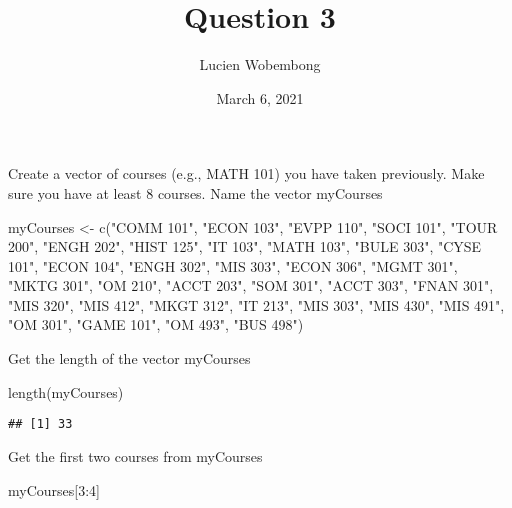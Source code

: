 \documentclass[]{article}
\title{Question 3}
\author{Lucien Wobembong}
\date{March 6, 2021}
\newenvironment{Shaded}{\begin{snugshade}}{\end{snugshade}}
\newcommand{\DecValTok}[1]{\textcolor[rgb]{0.00,0.00,0.81}{#1}}
\newcommand{\FunctionTok}[1]{\textcolor[rgb]{0.00,0.00,0.00}{#1}}
\newcommand{\NormalTok}[1]{#1}
\newcommand{\OtherTok}[1]{\textcolor[rgb]{0.56,0.35,0.01}{#1}}
\newcommand{\SpecialCharTok}[1]{\textcolor[rgb]{0.00,0.00,0.00}{#1}}
\newcommand{\StringTok}[1]{\textcolor[rgb]{0.31,0.60,0.02}{#1}}
\begin{document}
\maketitle

Create a vector of courses (e.g., MATH 101) you have taken previously.
Make sure you have at least 8 courses. Name the vector myCourses

\begin{Shaded}
\begin{Highlighting}[]
\NormalTok{myCourses }\OtherTok{\textless{}{-}} \FunctionTok{c}\NormalTok{(}\StringTok{"COMM 101"}\NormalTok{, }\StringTok{"ECON 103"}\NormalTok{, }\StringTok{"EVPP 110"}\NormalTok{, }\StringTok{"SOCI 101"}\NormalTok{, }\StringTok{"TOUR 200"}\NormalTok{, }\StringTok{"ENGH 202"}\NormalTok{, }\StringTok{"HIST 125"}\NormalTok{, }\StringTok{"IT 103"}\NormalTok{, }\StringTok{"MATH 103"}\NormalTok{, }\StringTok{"BULE 303"}\NormalTok{, }\StringTok{"CYSE 101"}\NormalTok{, }\StringTok{"ECON 104"}\NormalTok{, }\StringTok{"ENGH 302"}\NormalTok{, }\StringTok{"MIS 303"}\NormalTok{, }\StringTok{"ECON 306"}\NormalTok{, }\StringTok{"MGMT 301"}\NormalTok{, }\StringTok{"MKTG 301"}\NormalTok{, }\StringTok{"OM 210"}\NormalTok{, }\StringTok{"ACCT 203"}\NormalTok{, }\StringTok{"SOM 301"}\NormalTok{, }\StringTok{"ACCT 303"}\NormalTok{, }\StringTok{"FNAN 301"}\NormalTok{, }\StringTok{"MIS 320"}\NormalTok{, }\StringTok{"MIS 412"}\NormalTok{, }\StringTok{"MKGT 312"}\NormalTok{, }\StringTok{"IT 213"}\NormalTok{, }\StringTok{"MIS 303"}\NormalTok{, }\StringTok{"MIS 430"}\NormalTok{, }\StringTok{"MIS 491"}\NormalTok{, }\StringTok{"OM 301"}\NormalTok{, }\StringTok{"GAME 101"}\NormalTok{, }\StringTok{"OM 493"}\NormalTok{, }\StringTok{"BUS 498"}\NormalTok{)}
\end{Highlighting}
\end{Shaded}

Get the length of the vector myCourses

\begin{Shaded}
\begin{Highlighting}[]
\FunctionTok{length}\NormalTok{(myCourses)}
\end{Highlighting}
\end{Shaded}

\begin{verbatim}
## [1] 33
\end{verbatim}

Get the first two courses from myCourses

\begin{Shaded}
\begin{Highlighting}[]
\NormalTok{myCourses[}\DecValTok{3}\SpecialCharTok{:}\DecValTok{4}\NormalTok{]}
\end{Highlighting}
\end{Shaded}
\end{document}
